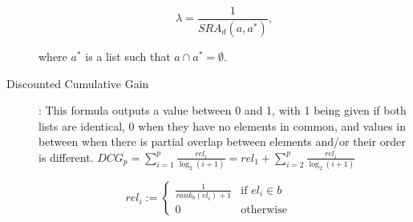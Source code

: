 \begin{description}
	      \[
		      \lambda = \frac{1}{SRA_{d}(a, a^{*})},
	      \]

	      where \(a^{*}\) is a list such that \(a \cap a^{*} = \emptyset\).

	\item [Discounted Cumulative Gain]:
	      This formula outputs a value between 0 and 1, with 1 being given if both lists are identical, 0 when they have no elements in common, and values in between when there is partial overlap between elements and/or their order is different.
	      ${DCG_{p}} =\sum _{i=1}^{p}{\frac {rel_{i}}{\log _{2}(i+1)}}=rel_{1}+\sum _{i=2}^{p}{\frac {rel_{i}}{\log _{2}(i+1)}}$
\end{description}

\[
	rel_{i} :=
	\begin{cases}
		\frac{1}{rank_{b}(el_{i}) + 1} & \text{if } el_{i} \in b \\
		0                              & \text{otherwise}
	\end{cases}
\]
